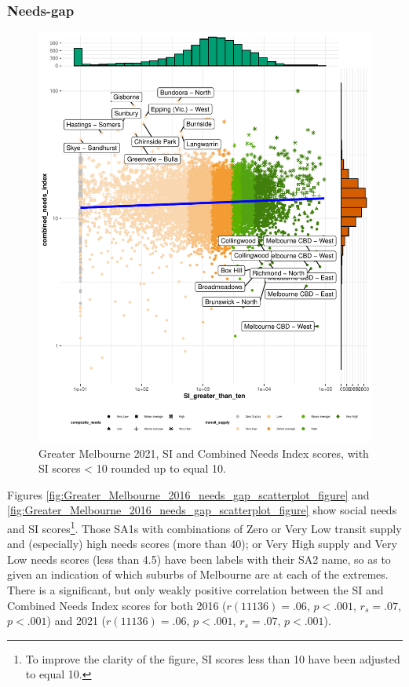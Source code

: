 \documentclass[preprint, 3p,
authoryear]{elsarticle} %
\begin{document}
\subsubsection{Needs-gap}\label{needs-gap}

\begin{figure}
\centering
\includegraphics{ReynoldsCurrieQu2024_files/figure-latex/Greater_Melbourne_2021_needs_gap_scatterplot_figure-1.pdf}
\caption{Greater Melbourne 2021, SI and Combined Needs Index scores,
with SI scores \textless{} 10 rounded up to equal 10.}
\end{figure}

Figures \ref{fig:Greater_Melbourne_2016_needs_gap_scatterplot_figure}
and \ref{fig:Greater_Melbourne_2016_needs_gap_scatterplot_figure} show
social needs and SI scores\footnote{To improve the clarity of the
  figure, SI scores less than 10 have been adjusted to equal 10.}. Those
SA1s with combinations of Zero or Very Low transit supply and
(especially) high needs scores (more than 40); or Very High supply and
Very Low needs scores (less than 4.5) have been labels with their SA2
name, so as to given an indication of which suburbs of Melbourne are at
each of the extremes. There is a significant, but only weakly positive
correlation between the SI and Combined Needs Index scores for both 2016
(\(r(11136) = .06\), \(p < .001\), \(r_s =.07\), \(p < .001\)) and 2021
(\(r(11136) = .06\), \(p < .001\), \(r_s =.07\), \(p < .001\)).
\end{document}
